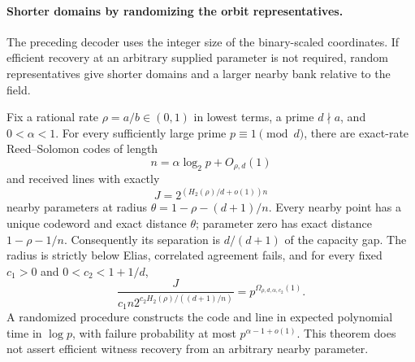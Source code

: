 \paragraph{Shorter domains by randomizing the orbit representatives.}
The preceding decoder uses the integer size of the binary-scaled
coordinates. If efficient recovery at an arbitrary supplied parameter
is not required, random representatives give shorter domains and a
larger nearby bank relative to the field.

\begin{theorem}
\label{ou:random}
Fix a rational rate $\rho=a/b\in(0,1)$ in lowest terms, a prime
$d\nmid a$, and $0<\alpha<1$. For every sufficiently large prime
$p\equiv1\pmod d$, there are exact-rate Reed--Solomon codes of length
\[
 n=\alpha\log_2p+O_{\rho,d}(1)
\]
and received lines with exactly
\[
 J=2^{(H_2(\rho)/d+o(1))n}
\]
nearby parameters at radius $\theta=1-\rho-(d+1)/n$.
Every nearby point has a unique codeword and exact distance $\theta$;
parameter zero has exact distance $1-\rho-1/n$.
Consequently its separation is $d/(d+1)$ of the capacity gap.
The radius is strictly below Elias, correlated agreement fails, and
for every fixed $c_1>0$ and $0<c_2<1+1/d$,
\[
 \frac{J}{c_1n2^{c_2H_2(\rho)/((d+1)/n)}}=p^{\Omega_{\rho,d,\alpha,c_2}(1)}.
\]
A randomized procedure constructs the code and line in expected
polynomial time in $\log p$, with failure probability at most
$p^{\alpha-1+o(1)}$. This theorem does not assert efficient witness
recovery from an arbitrary nearby parameter.
\end{theorem}
